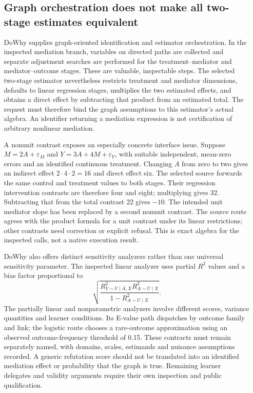 \subsection{Graph orchestration does not make all two-stage estimates equivalent}
DoWhy supplies graph-oriented identification and estimator orchestration. In the inspected mediation branch, variables on directed paths are collected and separate adjustment searches are performed for the treatment--mediator and mediator--outcome stages. These are valuable, inspectable steps. The selected two-stage estimator nevertheless restricts treatment and mediator dimensions, defaults to linear regression stages, multiplies the two estimated effects, and obtains a direct effect by subtracting that product from an estimated total. The request must therefore bind the graph assumptions to this estimator's actual algebra. An identifier returning a mediation expression is not certification of arbitrary nonlinear mediation. \citep{exec25_pymed_dowhy}

A nonunit contrast exposes an especially concrete interface issue. Suppose $M=2A+\varepsilon_M$ and $Y=3A+4M+\varepsilon_Y$, with suitable independent, mean-zero errors and an identified continuous treatment. Changing $A$ from zero to two gives an indirect effect $2\cdot4\cdot2=16$ and direct effect six. The selected source forwards the same control and treatment values to both stages. Their regression intervention contrasts are therefore four and eight; multiplying gives 32. Subtracting that from the total contrast 22 gives $-10$. The intended unit mediator slope has been replaced by a second nonunit contrast. The source route agrees with the product formula for a unit contrast under its linear restrictions; other contrasts need correction or explicit refusal. This is exact algebra for the inspected calls, not a native execution result. \citep{exec25_pymed_dowhy,exec25_pymed_choice}

DoWhy also offers distinct sensitivity analyzers rather than one universal sensitivity parameter. The inspected linear analyzer uses partial $R^2$ values and a bias factor proportional to
\[
 \sqrt{\frac{R^2_{Y\sim U\mid A,X}R^2_{A\sim U\mid X}}
 {1-R^2_{A\sim U\mid X}}}.
\]
The partially linear and nonparametric analyzers involve different scores, variance quantities and learner conditions. Its E-value path dispatches by outcome family and link; the logistic route chooses a rare-outcome approximation using an observed outcome-frequency threshold of 0.15. These contracts must remain separately named, with domains, scales, estimands and nuisance assumptions recorded. A generic refutation score should not be translated into an identified mediation effect or probability that the graph is true. Remaining learner delegates and validity arguments require their own inspection and public qualification. \citep{exec25_pymed_dowhy,exec25_pymed_choice}

